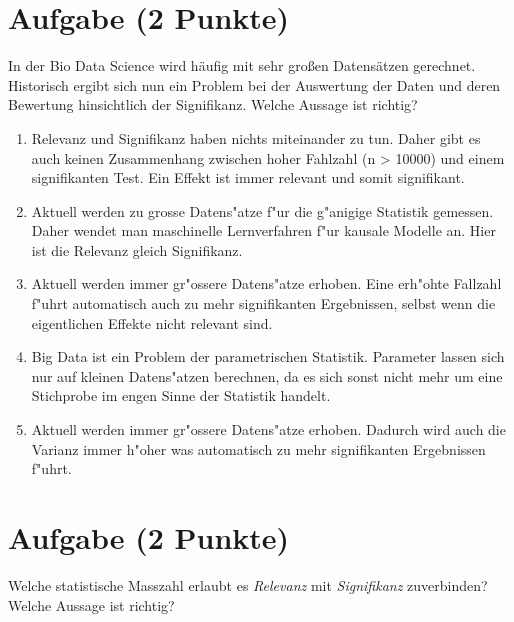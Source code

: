 \documentclass[a4paper, 9pt]{scrartcl}\usepackage[]{graphicx}\usepackage[]{xcolor}
\begin{document}
\section{Aufgabe \hfill (2 Punkte)}

In der Bio Data Science wird h{\"a}ufig mit sehr gro{\ss}en Datens{\"a}tzen
gerechnet. Historisch ergibt sich nun ein Problem bei der Auswertung der
Daten und deren Bewertung hinsichtlich der Signifikanz. Welche Aussage ist richtig?



\begin{enumerate}
\item [\textbf{A} \msquare] Relevanz und Signifikanz haben nichts miteinander zu tun. Daher gibt es auch keinen Zusammenhang zwischen hoher Fahlzahl (n > 10000) und einem signifikanten Test. Ein Effekt ist immer relevant und somit signifikant.
\item [\textbf{B} \msquare] Aktuell werden zu grosse Datens{"a}tze f{"u}r die g{"a}nigige Statistik gemessen. Daher wendet man maschinelle Lernverfahren f{"u}r kausale Modelle an. Hier ist die Relevanz gleich Signifikanz.
\item [\textbf{C} \msquare] Aktuell werden immer gr{"o}ssere Datens{"a}tze erhoben. Eine erh{"o}hte Fallzahl f{"u}hrt automatisch auch zu mehr signifikanten Ergebnissen, selbst wenn die eigentlichen Effekte nicht relevant sind.
\item [\textbf{D} \msquare] Big Data ist ein Problem der parametrischen Statistik. Parameter lassen sich nur auf kleinen Datens{"a}tzen berechnen, da es sich sonst nicht mehr um eine Stichprobe im engen Sinne der Statistik handelt.
\item [\textbf{E} \msquare] Aktuell werden immer gr{"o}ssere Datens{"a}tze erhoben. Dadurch wird auch die Varianz immer h{"o}her was automatisch zu mehr signifikanten Ergebnissen f{"u}hrt.
\end{enumerate}

\section{Aufgabe \hfill (2 Punkte)}

Welche statistische Masszahl erlaubt es \textit{Relevanz} mit
\textit{Signifikanz} zuverbinden? Welche Aussage ist richtig?
\end{document}
